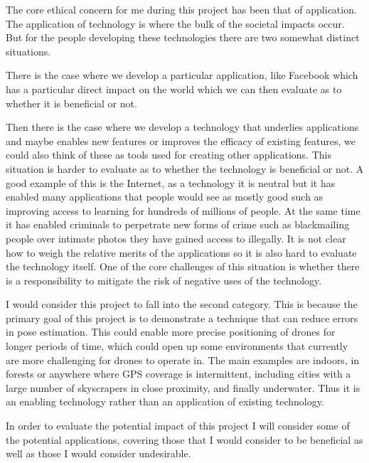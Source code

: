 \documentclass[]{../resources/final_report}
\begin{document}
The core ethical concern for me during this project has been that of application.
The application of technology is where the bulk of the societal impacts occur. 
But for the people developing these technologies there are two somewhat distinct situations. 

There is the case where we develop a particular application, like Facebook which has a particular
direct impact on the world which we can then evaluate as to whether it is beneficial or not. 

Then there is the case where we develop a technology that underlies applications and maybe 
enables new features or improves the efficacy of existing features, we could also think of 
these as tools used for creating other applications. This situation is harder to evaluate as 
to whether the technology is beneficial or not. 
A good example of this is the Internet, as a technology it is neutral but it has enabled many 
applications that people would see as mostly good such as improving access to learning for 
hundreds of millions of people. At the same time it has enabled criminals to perpetrate new 
forms of crime such as blackmailing people over intimate photos they have gained access to 
illegally. It is not clear how to weigh the relative merits of the applications so it is also
hard to evaluate the technology itself. One of the core challenges of this situation is whether 
there is a responsibility to mitigate the risk of negative uses of the technology.

I would consider this project to fall into the second category. This is because the primary goal 
of this project is to demonstrate a technique that can reduce errors in pose estimation. This 
could enable more precise positioning of drones for longer periods of time, which could open up 
some environments that currently are more challenging for drones to operate in. The main examples
are indoors, in forests or anywhere where GPS coverage is intermittent, including cities with a 
large number of skyscrapers in close proximity, and finally underwater.
Thus it is an enabling technology rather than an application of existing technology.

In order to evaluate the potential impact of this project I will consider some of the potential 
applications, covering those that I would consider to be beneficial as well as those I would 
consider undesirable.
 
\end{document}
